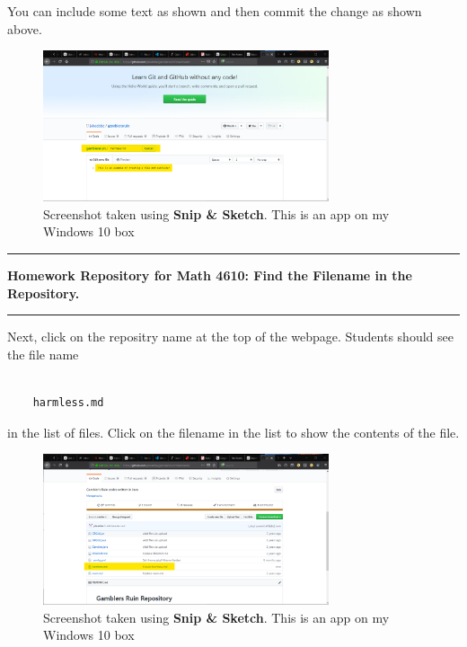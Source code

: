 \documentclass[10pt,fleqn]{article}
\begin{document}
You can include some text as shown and then commit the change as shown above.
\vfill
\begin{figure}[h]
\centering
\includegraphics[width=0.75\textwidth]{../images/github_08.png}
\caption{{Screenshot} taken using {\bf Snip \& Sketch}. This is an app on
         my Windows 10 box}
\end{figure}
\eject
\vskip0.1in\hrule\vskip0.1in
\noindent
{\bf Homework Repository for Math 4610: Find the Filename in the Repository.} 
\vskip0.1in\hrule\vskip0.1in
Next, click on the repositry name at the top of the webpage. Students should see
the file name
\begin{verbatim}

    harmless.md

\end{verbatim}
in the list of files. Click on the filename in the list to show the contents of
the file. 
\vfill
\begin{figure}[h]
\centering
\includegraphics[width=0.75\textwidth]{../images/github_09.png}
\caption{{Screenshot} taken using {\bf Snip \& Sketch}. This is an app on
         my Windows 10 box}
\end{figure}
\eject
\end{document}
